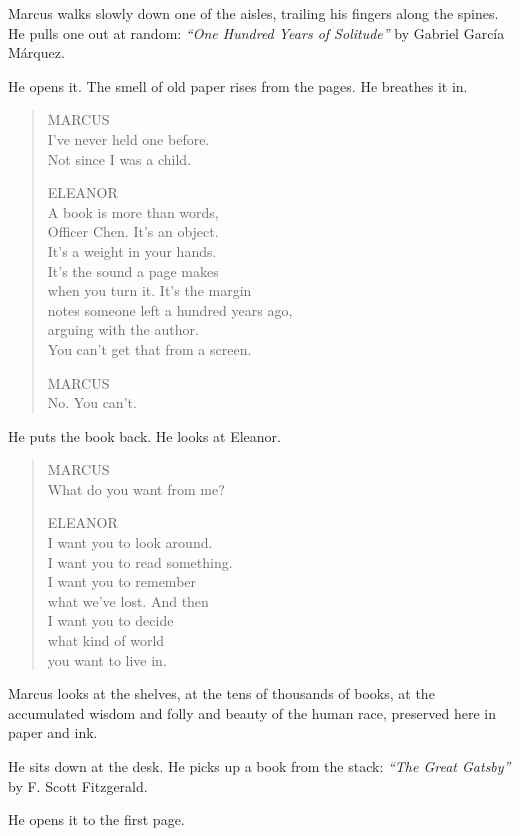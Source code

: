 \documentclass[
    language=english,
    doctype=screenplay,
    institution=none,
]{../../omnilatex}
\begin{document}
Marcus walks slowly down one of the aisles, trailing his fingers along the spines. He pulls one out at random: \textit{ ``One Hundred Years of Solitude''} by Gabriel Garc\'{i}a M\'{a}rquez.

He opens it. The smell of old paper rises from the pages. He breathes it in.

\begin{quote}
MARCUS\\
I've never held one before.\\
Not since I was a child.

ELEANOR\\
A book is more than words,\\
Officer Chen. It's an object.\\
It's a weight in your hands.\\
It's the sound a page makes\\
when you turn it. It's the margin\\
notes someone left a hundred years ago,\\
arguing with the author.\\
You can't get that from a screen.

MARCUS\\
No. You can't.
\end{quote}

He puts the book back. He looks at Eleanor.

\begin{quote}
MARCUS\\
What do you want from me?

ELEANOR\\
I want you to look around.\\
I want you to read something.\\
I want you to remember\\
what we've lost. And then\\
I want you to decide\\
what kind of world\\
you want to live in.
\end{quote}

Marcus looks at the shelves, at the tens of thousands of books, at the accumulated wisdom and folly and beauty of the human race, preserved here in paper and ink.

He sits down at the desk. He picks up a book from the stack: \textit{ ``The Great Gatsby''} by F. Scott Fitzgerald.

He opens it to the first page.
\end{document}
